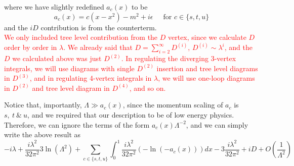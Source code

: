 \documentclass[11pt]{article}
\numberwithin{equation}{section}
\begin{document}
\begin{figure}[H]
    \centering
\end{figure}
where we have slightly redefined \(a_c(x)\) to be 
\begin{equation*}
    a_c(x) = c(x-x^2) - m^2 + i\epsilon ~~~~~\text{ for }c\in\{s,t,u\}
\end{equation*}
and the \(iD\) contribution is from the counterterm. \\
\textcolor{red}{We only included tree level contribution from the \(D\) vertex, since we calculate \(D\) order by order in \(\lambda\). We already said that \(D = \sum_{i=2}^{\infty} D^{(i)}\), \(D^{(i)} \sim \lambda^i\), and the \(D\) we calculated above was just \(D^{(2)}\). In regulating the diverging 3-vertex integrals, we will use diagrams with single \(D^{(2)}\) insertion and tree level diagrams in \(D^{(3)}\), and in regulating 4-vertex integrals in \(\lambda\), we will use one-loop diagrams in \(D^{(2)}\) and tree level diagram in \(D^{(4)}\), and so on.\\ }

Notice that, importantly, \(\Lambda \gg a_c(x)\), since the momentum scaling of \(a_c\) is \(s,~t~\& ~u\), and we required that our description to be of low energy physics. Therefore, we can ignore the terms of the form \(a_c(x)\Lambda^{-2}\), and we can simply write the above result as 
\begin{equation*}
    -i\lambda +  \frac{i\lambda^2 }{32\pi^2} 3\ln(\Lambda^2) +  \sum_{c\in\{s,t,u\}} \int_0^1  \frac{i\lambda^2 }{32\pi^2} \left( - \ln (-a_c(x)) \right)dx -  3\frac{i\lambda^2 }{32\pi^2}+ iD + O\left(\frac{1}{\Lambda^2}\right)
\end{equation*}
\end{document}
